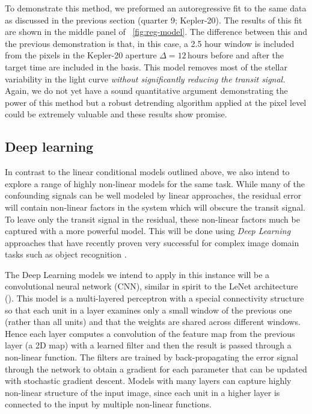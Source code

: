 \documentclass[letterpaper,12pt,whitepaper]{haastex}
\begin{document}
To demonstrate this method, we preformed an autoregressive fit to the same
data as discussed in the previous section (quarter 9; Kepler-20).
The results of this fit are shown in the middle panel of
\figurename~\ref{fig:reg-model}.
The difference between this and the previous demonstration is that, in this
case, a 2.5 hour window is included from the pixels in the Kepler-20 aperture
$\Delta = 12\,\mathrm{hours}$ before and after the target time are included in
the basis.
This model removes most of the stellar variability in the light curve
  \emph{without significantly reducing the transit signal.}
Again, we do not yet have a sound quantitative argument demonstrating the power of
this method but a robust detrending algorithm applied at the pixel level could
be extremely valuable and these results show promise.

\subsection{Deep learning}\label{sec:deep}

In contrast to the linear conditional models outlined above, we also
intend to explore a range of highly non-linear models for the same
task. While many of the confounding signals can be well modeled by
linear approaches, the residual error will contain non-linear
factors in the system which will obscure the transit signal. To leave
only the transit signal in the residual, these non-linear factors much
be captured with a more powerful model. This will be done using \emph{Deep
Learning} approaches that have recently proven very successful for
complex image domain tasks such as object recognition \citep{Kriz12}.

The Deep Learning models we intend to apply in this instance will be a
convolutional neural network (CNN), similar in spirit to the LeNet
architecture (\citealt{LeCun1998}). This model is a
multi-layered perceptron with a special connectivity structure so that
each unit in a layer examines only a small window of the previous one
(rather than all units) and that the weights are shared across
different windows. Hence each layer computes a convolution of the
feature map from the previous layer (a 2D map) with a learned filter
and then the result is passed through a non-linear function. The
filters are trained by back-propagating the error signal through the
network to obtain a gradient for each parameter that can be updated
with stochastic gradient descent. Models with many layers can capture
highly non-linear structure of the input image, since each unit in a
higher layer is connected to the input by multiple non-linear
functions.
\end{document}
